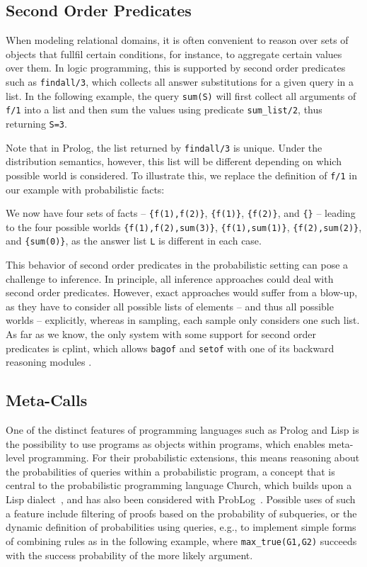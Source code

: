 \documentclass[a4paper]{article}
\begin{document}
\subsection{Second Order Predicates}
\label{sec:aggregation}
When modeling relational domains, it is often convenient to reason
over sets of objects that fullfil certain conditions, for instance, to
aggregate certain values over them. In logic programming, this is
supported by second order predicates such as \texttt{findall/3}, which
collects all answer substitutions for a given query in a list.  In the following example, the query \verb|sum(S)| will first collect all arguments of \verb|f/1| into a list and then sum the values using predicate \verb|sum_list/2|, thus returning \verb|S=3|.

Note that in Prolog, the list returned by \verb|findall/3| is unique. Under the distribution semantics, however, this list will be different depending on which possible world is considered. 
To illustrate this, we replace the definition of \verb|f/1| in our example with probabilistic facts:

We now have  four sets of facts -- \verb|{f(1),f(2)}|, \verb|{f(1)}|,
\verb|{f(2)}|, and \verb|{}| -- leading to the four possible worlds \verb|{f(1),f(2),sum(3)}|, \verb|{f(1),sum(1)}|,
\verb|{f(2),sum(2)}|, and \verb|{sum(0)}|, as the answer list \verb|L|
is different in each case. 


This behavior of second order predicates in the probabilistic setting
can pose a challenge to inference. 
In principle, all inference approaches could 
deal with second order predicates. 
However, exact
approaches would 
suffer from a blow-up, as they have to consider all possible lists of
elements -- and thus all possible worlds -- explicitly, whereas in sampling, each sample only considers
one such list. As far as we know, the only system with some support
for second order predicates is cplint, which allows \verb|bagof| and \verb|setof|
with one of its backward reasoning modules \citep{cplintmanual}. 


\subsection{Meta-Calls}
\label{sec:metacalls}
One of the distinct features of programming languages such as Prolog
and Lisp is the possibility to use programs as objects within
programs, which enables meta-level programming. For their
probabilistic extensions, this means reasoning about the probabilities
of queries within a probabilistic program, a concept that is central
to the probabilistic programming language Church, which builds upon a
Lisp dialect~\citep{Goodman08}, and has also been considered with
ProbLog~\citep{Mantadelis11}.  
Possible uses of such a feature include filtering of proofs based on
the probability of subqueries, or the dynamic definition of
probabilities using queries, e.g., to implement simple forms of
combining rules as in the following example, where \verb|max_true(G1,G2)| succeeds with the
success probability of the more likely argument. 
\end{document}
